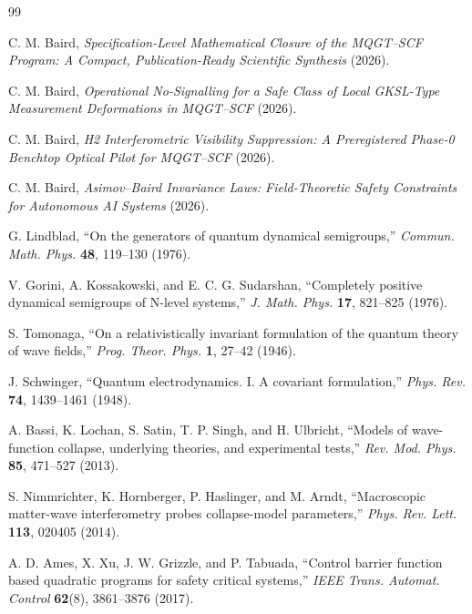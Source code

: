 \documentclass[aps,prd,twocolumn,superscriptaddress,nofootinbib]{revtex4-2}
\begin{document}
\begin{thebibliography}{99}

C. M. Baird,
\emph{Specification-Level Mathematical Closure of the MQGT--SCF Program: A Compact, Publication-Ready Scientific Synthesis}
(2026).

C. M. Baird,
\emph{Operational No-Signalling for a Safe Class of Local GKSL-Type Measurement Deformations in MQGT--SCF}
(2026).

C. M. Baird,
\emph{H2 Interferometric Visibility Suppression: A Preregistered Phase-0 Benchtop Optical Pilot for MQGT--SCF}
(2026).

C. M. Baird,
\emph{Asimov--Baird Invariance Laws: Field-Theoretic Safety Constraints for Autonomous AI Systems}
(2026).

G. Lindblad,
``On the generators of quantum dynamical semigroups,''
\emph{Commun. Math. Phys.} \textbf{48}, 119--130 (1976).

V. Gorini, A. Kossakowski, and E. C. G. Sudarshan,
``Completely positive dynamical semigroups of N-level systems,''
\emph{J. Math. Phys.} \textbf{17}, 821--825 (1976).

S. Tomonaga,
``On a relativistically invariant formulation of the quantum theory of wave fields,''
\emph{Prog. Theor. Phys.} \textbf{1}, 27--42 (1946).

J. Schwinger,
``Quantum electrodynamics. I. A covariant formulation,''
\emph{Phys. Rev.} \textbf{74}, 1439--1461 (1948).

A. Bassi, K. Lochan, S. Satin, T. P. Singh, and H. Ulbricht,
``Models of wave-function collapse, underlying theories, and experimental tests,''
\emph{Rev. Mod. Phys.} \textbf{85}, 471--527 (2013).

S. Nimmrichter, K. Hornberger, P. Haslinger, and M. Arndt,
``Macroscopic matter-wave interferometry probes collapse-model parameters,''
\emph{Phys. Rev. Lett.} \textbf{113}, 020405 (2014).

A. D. Ames, X. Xu, J. W. Grizzle, and P. Tabuada,
``Control barrier function based quadratic programs for safety critical systems,''
\emph{IEEE Trans. Automat. Control} \textbf{62}(8), 3861--3876 (2017).

\end{thebibliography}
\end{document}
